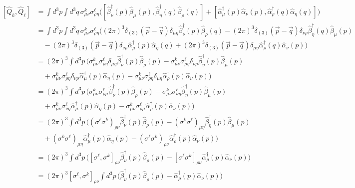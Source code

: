 \[ 
\begin{split}
    [\hat{Q}_k, \hat{Q}_\ell] &= \int d^3 p \int d^3 q \, \sigma^k_{\mu\nu} \sigma^\ell_{\rho\eta} \bigg( \left[ \hat{\beta}_\nu^\dagger (p) \hat{\beta}_\mu (p), \hat{\beta}_\eta^\dagger (q) \hat{\beta}_\rho (q) \right] + \left[ \hat{\alpha}_\mu^\dagger (p) \hat{\alpha}_\nu (p), \hat{\alpha}_\rho^\dagger (q) \hat{\alpha}_\eta (q) \right] \bigg) \\
    &= \int d^3 p \int d^3 q \, \sigma^k_{\mu\nu} \sigma^\ell_{\rho\eta} \bigg( (2\pi)^3 \delta_{(3)}(\vec{p}-\vec{q}) \delta_{\mu\eta} \hat{\beta}_\nu^\dagger (p) \hat{\beta}_\rho (q) - (2\pi)^3 \delta_{(3)}(\vec{p}-\vec{q}) \delta_{\nu\rho} \hat{\beta}_\eta^\dagger (q) \hat{\beta}_\mu (p)   \\
    &\quad - (2\pi)^3 \delta_{(3)}(\vec{p}-\vec{q}) \delta_{\nu\rho} \hat{\alpha}_\mu^\dagger (p) \hat{\alpha}_\eta (q) + (2\pi)^3 \delta_{(3)}(\vec{p}-\vec{q}) \delta_{\mu\eta}\hat{\alpha}_\rho^\dagger (q) \hat{\alpha}_\nu (p)  \bigg)\\
    &= (2\pi)^3\int d^3 p \,\bigg( \sigma^k_{\mu\nu} \sigma^\ell_{\rho\eta} \delta_{\mu\eta} \hat{\beta}_\nu^\dagger (p) \hat{\beta}_\rho (p) 
    -\sigma^k_{\mu\nu} \sigma^\ell_{\rho\eta} \delta_{\nu\rho}\hat{\beta}_\eta^\dagger (p)\hat{\beta}_\mu (p)   \\
    &\quad + \sigma^k_{\mu\nu} \sigma^\ell_{\rho\eta} \delta_{\nu\rho} \hat{\alpha}_\mu^\dagger (p) \hat{\alpha}_\eta (p) 
    - \sigma^k_{\mu\nu} \sigma^\ell_{\rho\eta} \delta_{\mu\eta}\hat{\alpha}_\rho^\dagger (p)  \hat{\alpha}_\nu (p)  \bigg)\\
    &= (2\pi)^3 \int d^3 p \,\bigg( \sigma^k_{\mu\nu} \sigma^\ell_{\rho\mu} \hat{\beta}_\nu^\dagger (p) \hat{\beta}_\rho (p) 
    -\sigma^k_{\mu\nu} \sigma^\ell_{\nu\eta}  \hat{\beta}_\eta^\dagger (p)\hat{\beta}_\mu (p)  \\
    &\quad + \sigma^k_{\mu\nu} \sigma^\ell_{\nu\eta}  \hat{\alpha}_\mu^\dagger (p) \hat{\alpha}_\eta (p) 
    - \sigma^k_{\mu\nu} \sigma^\ell_{\rho\mu}  \hat{\alpha}_\rho^\dagger (p) \hat{\alpha}_\nu (p) \bigg) \\
    &= (2\pi)^3 \int d^3 p \,\bigg(  {(\sigma^\ell \sigma^k)}_{\rho\nu} \hat{\beta}_\nu^\dagger (p) \hat{\beta}_\rho (p) 
    -{(\sigma^k \sigma^\ell)}_{\mu\eta}  \hat{\beta}_\eta^\dagger (p)\hat{\beta}_\mu (p)  \\
    &\quad + (\sigma^k \sigma^\ell)_{\mu\eta}  \hat{\alpha}_\mu^\dagger (p) \hat{\alpha}_\eta (p) 
    - (\sigma^\ell \sigma^k)_{\rho\nu}  \hat{\alpha}_\rho^\dagger (p) \hat{\alpha}_\nu (p) \bigg) \\
    &= (2\pi)^3 \int d^3 p \,\bigg(  {[\sigma^\ell,\sigma^k]}_{\rho\nu} \hat{\beta}_\nu^\dagger (p) \hat{\beta}_\rho (p)  
    - [\sigma^\ell \sigma^k]_{\rho\nu}  \hat{\alpha}_\rho^\dagger (p) \hat{\alpha}_\nu (p) \bigg) \\
    &=(2\pi)^3 {[\sigma^\ell,\sigma^k]}_{\rho\nu} \int d^3 p \,   \bigg( \hat{\beta}_\nu^\dagger (p) \hat{\beta}_\rho (p)  
    -   \hat{\alpha}_\rho^\dagger (p) \hat{\alpha}_\nu (p) \bigg) 
\end{split}
\]
